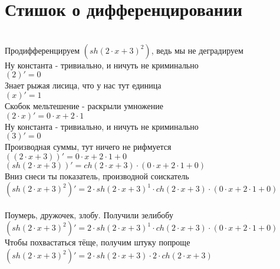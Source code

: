 \documentclass[a4paper,12pt]{article}
\begin{document}
\section*{Стишок о дифференцировании}\\
Продифференцируем $( sh (2 \cdot x + 3)  ^{2} )$, ведь мы не деградируем\\
Ну константа - тривиально, и ничуть не криминально\\
\begin{math}
	(2)' = 0
\end{math}\\
Знает рыжая лисица, что у нас тут единица\\
\begin{math}
	(x)' = 1
\end{math}\\
Скобок мельтешение - раскрыли умножение\\
\begin{math}
	(2 \cdot x)' = 0 \cdot x + 2 \cdot 1
\end{math}\\
Ну константа - тривиально, и ничуть не криминально\\
\begin{math}
	(3)' = 0
\end{math}\\
Производная суммы, тут ничего не рифмуется\\
\begin{math}
	((2 \cdot x + 3))' = 0 \cdot x + 2 \cdot 1 + 0
\end{math}\\
\begin{math}
	( sh (2 \cdot x + 3) )' =  ch (2 \cdot x + 3)  \cdot (0 \cdot x + 2 \cdot 1 + 0)
\end{math}\\
Вниз снеси ты показатель, производной соискатель\\
\begin{math}
	( sh (2 \cdot x + 3)  ^{2} )' = 2 \cdot  sh (2 \cdot x + 3)  ^{1}  \cdot  ch (2 \cdot x + 3)  \cdot (0 \cdot x + 2 \cdot 1 + 0)
\end{math}\\
\\Поумерь, дружочек, злобу. Получили зелибобу\\ $( sh (2 \cdot x + 3)  ^{2} )' = 2 \cdot  sh (2 \cdot x + 3)  ^{1}  \cdot  ch (2 \cdot x + 3)  \cdot (0 \cdot x + 2 \cdot 1 + 0)$\\
Чтобы похвастаться тёще, получим штуку попроще\\
$( sh (2 \cdot x + 3)  ^{2} )' = 2 \cdot  sh (2 \cdot x + 3)  \cdot 2 \cdot  ch (2 \cdot x + 3) $\\
\end{document}
